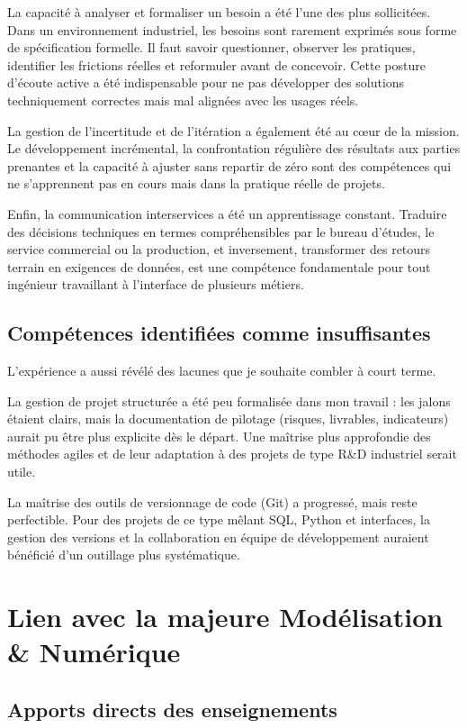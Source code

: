 La capacité à analyser et formaliser un besoin a été l'une des plus sollicitées. Dans un environnement industriel, les besoins sont rarement exprimés sous forme de spécification formelle. Il faut savoir questionner, observer les pratiques, identifier les frictions réelles et reformuler avant de concevoir. Cette posture d'écoute active a été indispensable pour ne pas développer des solutions techniquement correctes mais mal alignées avec les usages réels.

La gestion de l'incertitude et de l'itération a également été au cœur de la mission. Le développement incrémental, la confrontation régulière des résultats aux parties prenantes et la capacité à ajuster sans repartir de zéro sont des compétences qui ne s'apprennent pas en cours mais dans la pratique réelle de projets.

Enfin, la communication interservices a été un apprentissage constant. Traduire des décisions techniques en termes compréhensibles par le bureau d'études, le service commercial ou la production, et inversement, transformer des retours terrain en exigences de données, est une compétence fondamentale pour tout ingénieur travaillant à l'interface de plusieurs métiers.

\subsection{Compétences identifiées comme insuffisantes}

L'expérience a aussi révélé des lacunes que je souhaite combler à court terme.

La gestion de projet structurée a été peu formalisée dans mon travail : les jalons étaient clairs, mais la documentation de pilotage (risques, livrables, indicateurs) aurait pu être plus explicite dès le départ. Une maîtrise plus approfondie des méthodes agiles et de leur adaptation à des projets de type R\&D industriel serait utile.

La maîtrise des outils de versionnage de code (Git) a progressé, mais reste perfectible. Pour des projets de ce type mêlant SQL, Python et interfaces, la gestion des versions et la collaboration en équipe de développement auraient bénéficié d'un outillage plus systématique.

\section{Lien avec la majeure Modélisation \& Numérique}

\subsection{Apports directs des enseignements}

